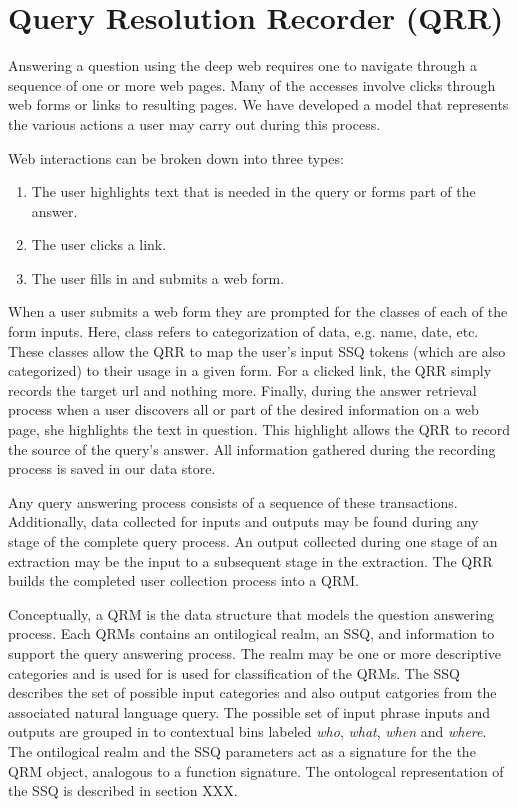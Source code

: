 \section{Query Resolution Recorder (QRR)}
\label{sec:qrr}
Answering a question using the deep web requires one to navigate
through a sequence of one or more web pages. Many of the accesses involve clicks through web forms or links to resulting pages.  We have developed a model that represents the various actions a user may carry out during this process.

Web interactions can be broken down into three types:
\begin{enumerate}
\item The user highlights text that is needed in the query or forms part of the answer.
\item The user clicks a link.
\item The user fills in and submits a web form. 
\end{enumerate}

When a user submits a web form they are prompted for the classes of each of the form inputs. Here, class refers to categorization of data, e.g. name, date, etc. These classes allow the QRR to map the user's input SSQ tokens (which are also categorized) to their usage in a given form. For a clicked link, the QRR simply records the target url and nothing more. Finally, during the answer retrieval process when a user discovers all or part of the desired information on a web page, she highlights the text in question. This highlight allows the QRR to record the source of the query's answer. All information gathered during the recording process is saved in our data store. 

Any query answering process consists of a sequence of these transactions.
Additionally, data collected for inputs and outputs may be found
during any stage of the complete query process.  An output
collected during one stage of an extraction may be the input to a
subsequent stage in the extraction.  The QRR builds the completed user
collection process into a QRM.  

Conceptually, a QRM is the data structure that models the question answering process.  Each QRMs contains an ontilogical realm, an SSQ, and information to support the query answering process.  The realm may be one or more descriptive categories and is used for is used for classification of the QRMs.  The SSQ describes the set of possible input categories and also output catgories from the associated natural language query.  The possible set of input phrase inputs and outputs are grouped in to contextual bins labeled \emph{who}, \emph{what}, \emph{when} and \emph{where}.  The ontilogical realm and the SSQ parameters act as a signature for the the QRM object, analogous to a function signature.   The ontologcal representation of the SSQ is described in section {{XXX}}.  

